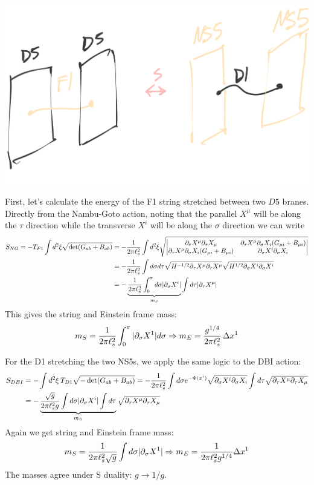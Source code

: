 \documentclass[11pt, class=article, crop=false]{standalone}
\begin{document}
\begin{enumerate}
	\begin{center}
		\includegraphics[scale=0.18]{"Drawings/D5 S NS5"}
	\end{center}
	
	First, let's calculate the energy of the F1 string stretched between two $D5$ branes. %
	Directly from the Nambu-Goto action, noting that the parallel $X^\mu$ will be along the $\tau$ direction while the transverse $X^i$ will be along the $\sigma$ direction we can write 
	\[
	\begin{aligned}
		S_{NG} = -T_{F1} \int d^2 \xi \sqrt{\det(G_{ab} + B_{ab})} &= -\frac{1}{2\pi \ell_s^2} \int d^2 \xi \sqrt{\begin{vmatrix}
			\partial_\tau X^\mu \partial_\tau X_\mu & \partial_\tau X^\mu \partial_\sigma X_i (G_{\mu i} + B_{\mu i})\\
			\partial_\tau X^\mu \partial_\sigma X_i (G_{\mu i} + B_{\mu i}) & \partial_\sigma X^i \partial_\sigma X_i
		\end{vmatrix}}\\
		&= -\frac{1}{2\pi \ell_s^2} \int d \sigma d\tau \sqrt{H^{-1/2} \partial_\tau X^\mu \partial_\tau X^\mu} \sqrt{H^{1/2} \partial_\sigma X^i \partial_\sigma X^i} \\
		&= -\underbrace{\frac{1}{2\pi \ell_s^2} \int_0^\pi d\sigma |\partial_\sigma X^i|}_{m_S} \int d\tau |\partial_\tau X^\mu| 
	\end{aligned}
	\]
	This gives the string and Einstein frame mass:
	\[
		m_S = \frac{1}{2\pi \ell_s^2} \int_0^\pi |\partial_\sigma X^1| d\sigma \Rightarrow m_E = \frac{g^{1/4}}{2\pi \ell_s^2} \, \Delta x^1
	\]
	
	For the D1 stretching the two NS5s, we apply the same logic to the DBI action:
	\[
	\begin{aligned}
		S_{DBI} &= -\int d^2 \xi\, T_{D1} \sqrt{-\det(G_{ab} + B_{ab})} = - \frac{1}{2\pi \ell_s^2}  \int d\sigma e^{-\Phi(x^i)} \sqrt{\partial_\sigma X^i \partial_\sigma X_i}  \int d\tau  \sqrt{\partial_\tau X^\mu \partial_\tau X_\mu}\\
		&= - \underbrace{\frac{\sqrt{g}}{2\pi \ell_s^2 g} \int d\sigma |\partial_\sigma X^i| \int d\tau}_{m_S}  \sqrt{\partial_\tau X^\mu \partial_\tau X_\mu}
	\end{aligned}
	\] 
	Again we get string and  Einstein frame mass: 
	\[
		m_S = \frac{1}{2\pi \ell_s^2 \sqrt g} \int d\sigma |\partial_\sigma X^1| \Rightarrow m_E = \frac{1}{2 \pi \ell_s^2 g^{1/4}} \Delta x^1
	\]
	The masses agree under S duality: $g \to 1/g$.
	

\end{enumerate}
\end{document}
